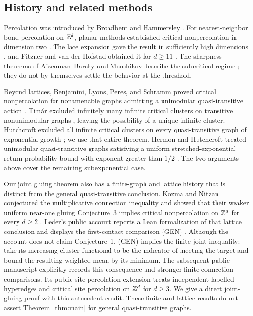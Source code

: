 \subsection{History and related methods}

Percolation was introduced by Broadbent and Hammersley
\cite{BroadbentHammersley1957}. For nearest-neighbor bond percolation
on $\mathbb Z^d$, planar methods established critical nonpercolation in
dimension two \cite{Harris1960,Kesten1980}. The lace expansion gave
the result in sufficiently high dimensions \cite{HaraSlade1990},
and Fitzner and van der Hofstad obtained it for $d\ge11$
\cite{FitznerHofstad2017}. The sharpness theorems of Aizenman--Barsky
and Menshikov describe the subcritical regime
\cite{AizenmanBarsky1987,Menshikov1986}; they do not by themselves
settle the behavior at the threshold.

Beyond lattices, Benjamini, Lyons, Peres, and Schramm proved critical
nonpercolation for nonamenable graphs admitting a unimodular
quasi-transitive action \cite{BLPS1999Critical}. Tim\'ar excluded
infinitely many infinite critical clusters on transitive
nonunimodular graphs \cite{Timar2006Nonunimodular}, leaving the
possibility of a unique infinite cluster. Hutchcroft excluded all
infinite critical clusters on every quasi-transitive graph of
exponential growth \cite[Theorem~1.2]{Hutchcroft2016}; we use that
entire theorem. Hermon and Hutchcroft treated unimodular
quasi-transitive graphs satisfying a uniform stretched-exponential
return-probability bound with exponent greater than $1/2$
\cite[Theorem~1.2]{HermonHutchcroft2021}. The two arguments above
cover the remaining subexponential case.

Our joint gluing theorem also has a finite-graph and lattice history
that is distinct from the general quasi-transitive conclusion.
Kozma and Nitzan conjectured the multiplicative connection inequality
\cite[Conjecture~1]{KozmaNitzan2024} and showed that their weaker
uniform near-one gluing Conjecture~3 implies critical nonpercolation
on $\mathbb Z^d$ for every $d\ge2$ \cite[Theorem~6]{KozmaNitzan2024}.
Leder's public account reports a Lean formalization of that lattice
conclusion and displays the first-contact comparison (GEN)
\cite[Section~3.4]{Leder2026}. Although the account does not claim
Conjecture~1, (GEN) implies the finite joint inequality: take its
increasing cluster functional to be the indicator of meeting the
target and bound the resulting weighted mean by its minimum.
The subsequent public manuscript \cite{ConnectionInequalities2026}
explicitly records this consequence and stronger finite connection
comparisons. Its public site-percolation extension
\cite{SiteCriticality2026} treats independent labelled hyperedges
and critical site percolation on $\mathbb Z^d$ for $d\ge3$. We give a direct
joint-gluing proof with this antecedent credit. These finite and
lattice results do not assert Theorem~\ref{thm:main} for general
quasi-transitive graphs.

